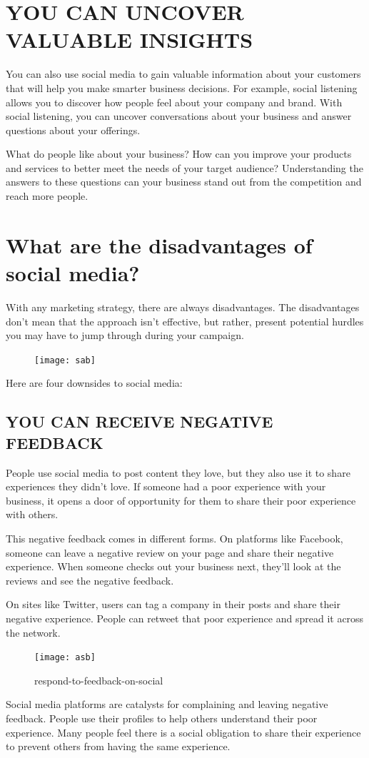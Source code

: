 \documentclass[a4paper]{article}
\begin{document}
  \section{YOU CAN UNCOVER VALUABLE INSIGHTS}
 You can also use social media to gain valuable information about your customers that will help you make smarter business decisions. For example, social listening allows you to discover how people feel about your company and brand. With social listening, you can uncover conversations about your business and answer questions about your offerings.

What do people like about your business? How can you improve your products and services to better meet the needs of your target audience? Understanding the answers to these questions can your business stand out from the competition and reach more people.
 \section{What are the disadvantages of social media?}
With any marketing strategy, there are always disadvantages. The disadvantages don’t mean that the approach isn’t effective, but rather, present potential hurdles you may have to jump through during your campaign.
\begin{figure}[h]
\centering
\texttt{[image: sab]}
\caption{}
\end{figure}
Here are four downsides to social media:
 \subsection{ YOU CAN RECEIVE NEGATIVE FEEDBACK}
 People use social media to post content they love, but they also use it to share experiences they didn’t love. If someone had a poor experience with your business, it opens a door of opportunity for them to share their poor experience with others.

This negative feedback comes in different forms. On platforms like Facebook, someone can leave a negative review on your page and share their negative experience. When someone checks out your business next, they’ll look at the reviews and see the negative feedback.

On sites like Twitter, users can tag a company in their posts and share their negative experience. People can retweet that poor experience and spread it across the network.
 \begin{figure}
 \centering
 \texttt{[image: asb]}
 \caption{respond-to-feedback-on-social}
 \end{figure}
 Social media platforms are catalysts for complaining and leaving negative feedback. People use their profiles to help others understand their poor experience. Many people feel there is a social obligation to share their experience to prevent others from having the same experience.
\end{document}
